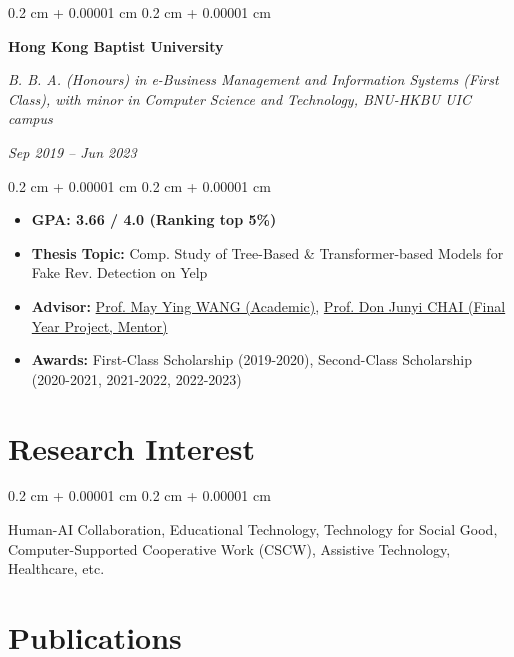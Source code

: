 \documentclass[10pt, letterpaper]{article}
\newenvironment{highlights}{
    \begin{itemize}[
        topsep=0.10 cm,
        parsep=0.10 cm,
        partopsep=0pt,
        itemsep=0pt,
        leftmargin=0.4 cm + 10pt
    ]
}{
    \end{itemize}
} %
\newenvironment{onecolentry}{
    \begin{adjustwidth}{
        0.2 cm + 0.00001 cm
    }{
        0.2 cm + 0.00001 cm
    }
}{
    \end{adjustwidth}
} %
\newenvironment{twocolentry}[2][]{
    \onecolentry
    \def\secondColumn{#2}
    \setcolumnwidth{\fill, 4.5 cm}
    \begin{paracol}{2}
}{
    \switchcolumn \raggedleft \secondColumn
    \end{paracol}
    \endonecolentry
} %
\let\hrefWithoutArrow\href
\renewcommand{\href}[2]{\hrefWithoutArrow{#1}{\ifthenelse{\equal{#2}{}}{ }{#2 }\raisebox{.15ex}{\footnotesize \faExternalLink*}}}
\renewcommand{\href}[2]{\hrefWithoutArrow{#1}{#2}}
\begin{document}
        \vspace{0.2 cm}

        \begin{twocolentry}{
        \textit{Sep 2019 – Jun 2023}}
            \textbf{Hong Kong Baptist University}

            \textit{B. B. A. (Honours) in e-Business Management and Information Systems (First Class), with minor in Computer Science and Technology, BNU-HKBU UIC campus}
        \end{twocolentry}

        \vspace{0.10 cm}
        \begin{onecolentry}
            \begin{highlights}
                \item \textbf{GPA: 3.66 / 4.0 (Ranking top 5\%)}
                \item \textbf{Thesis Topic:} Comp. Study of Tree-Based \& Transformer-based Models for Fake Rev. Detection on Yelp
                \item \textbf{Advisor:} \href{https://staff.uic.edu.cn/ywang/en}{Prof. May Ying WANG (Academic)}, \href{https://sites.google.com/view/chaijunyi/home}{Prof. Don Junyi CHAI (Final Year Project, Mentor)}
                \item \textbf{Awards:} First-Class Scholarship (2019-2020), Second-Class Scholarship (2020-2021, 2021-2022, 2022-2023)
            \end{highlights}
        \end{onecolentry}

    \section{Research Interest}

        \begin{onecolentry}
            Human-AI Collaboration, Educational Technology, Technology for Social Good, Computer-Supported Cooperative Work (CSCW), Assistive Technology, Healthcare, etc.
        \end{onecolentry}

    \section{Publications}
\end{document}
